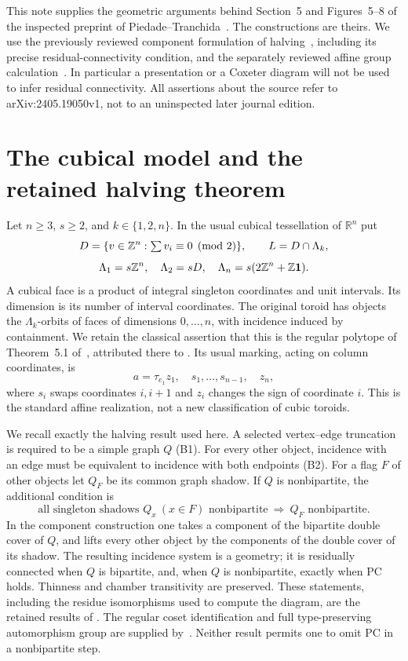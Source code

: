 This note supplies the geometric arguments behind Section~5 and
Figures~5--8 of the inspected preprint of Piedade--Tranchida~\cite{PT}.
The constructions are theirs. We use the previously reviewed
component formulation of halving~\cite{Parity}, including its precise
residual-connectivity condition, and the separately reviewed affine
group calculation~\cite{Affine}. In particular a presentation or a
Coxeter diagram will not be used to infer residual connectivity.
All assertions about the source refer to arXiv:2405.19050v1,
not to an uninspected later journal edition.

\section{The cubical model and the retained halving theorem}
Let $n\ge3$, $s\ge2$, and $k\in\{1,2,n\}$. In the usual cubical
tessellation of $\mathbb R^n$ put
\[
 D=\{v\in\mathbb Z^n:\textstyle\sum v_i\equiv0\pmod2\},\qquad
 L=D\cap\Lambda_k,
\]
\[
 \Lambda_1=s\mathbb Z^n,\quad\Lambda_2=sD,\quad
 \Lambda_n=s(2\mathbb Z^n+\mathbb Z\mathbf1).
\]
A cubical face is a product of integral singleton coordinates and
unit intervals. Its dimension is its number of interval coordinates.
The original toroid has objects the $\Lambda_k$-orbits of faces of
dimensions $0,\ldots,n$, with incidence induced by containment.
We retain the classical assertion that this is the regular polytope
of Theorem~5.1 of~\cite{PT}, attributed there to
\cite[Theorem~6D4]{MS}. Its usual marking, acting on column
coordinates, is
\[
 a=\tau_{e_1}z_1,\quad s_1,\ldots,s_{n-1},\quad z_n,
\]
where $s_i$ swaps coordinates $i,i+1$ and $z_i$ changes the sign of
coordinate $i$. This is the standard affine realization, not a new
classification of cubic toroids.

We recall exactly the halving result used here. A selected vertex--edge
truncation is required to be a simple graph $Q$ (B1). For every other
object, incidence with an edge must be equivalent to incidence with
both endpoints (B2). For a flag $F$ of other objects let $Q_F$ be its
common graph shadow. If $Q$ is nonbipartite, the additional condition is
\[
 \tag{PC}
 \text{all singleton shadows }Q_x\ (x\in F)\text{ nonbipartite}
 \ \Longrightarrow\ Q_F\text{ nonbipartite}.
\]
In the component construction one takes a component of the bipartite
double cover of $Q$, and lifts every other object by the components of
the double cover of its shadow. The resulting incidence system is a
geometry; it is residually connected when $Q$ is bipartite, and, when
$Q$ is nonbipartite, exactly when PC holds. Thinness and chamber
transitivity are preserved. These statements, including the residue
isomorphisms used to compute the diagram, are the retained results of
\cite{Parity}. The regular coset identification and full type-preserving
automorphism group are supplied by~\cite{Coset}. Neither result permits
one to omit PC in a nonbipartite step.

